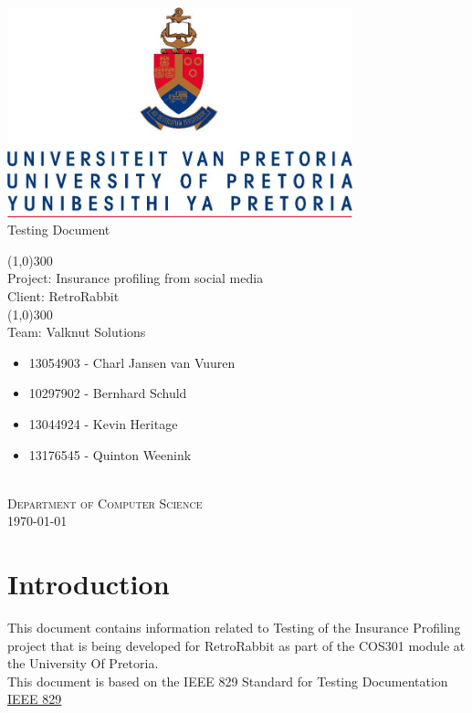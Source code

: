 \documentclass{article}
\begin{document}
	\begin{titlepage}
		\begin{center}
			\includegraphics[width=10cm]{images/UP.jpg}  \\
			[0.5cm]
			\huge{
			Testing Document\\
			}
			
			\line(1,0){300}\\
			[0.2cm]
			\LARGE{Project: Insurance profiling from social media\\
			Client: RetroRabbit} \\
			\line(1,0){300}\\
			\LARGE{Team: Valknut Solutions}\\
			[1.0cm]
			\large
			{
			\begin{itemize}
				\item 13054903 - Charl Jansen van Vuuren 
				\item 10297902 - Bernhard Schuld      
				\item 13044924 - Kevin Heritage
				\item 13176545 - Quinton Weenink\\
			\end{itemize}
			}
			\textsc{\large}\\
		[3.0cm]
		\textsc{\large  Department of Computer Science}\\
		[0.5cm]
		\textsc{\large \today}\\
		\end{center}
			
	\end{titlepage}
	\cleardoublepage
	\tableofcontents
	\cleardoublepage
\section{Introduction}
This document contains information related to Testing of the Insurance Profiling project that is being developed for RetroRabbit as part of the COS301 module at the University Of Pretoria. \\
This document is based on the IEEE 829 Standard for Testing Documentation \href{http://www.fit.vutbr.cz/study/courses/ITS/public/ieee829.html}{IEEE 829}
\end{document}
